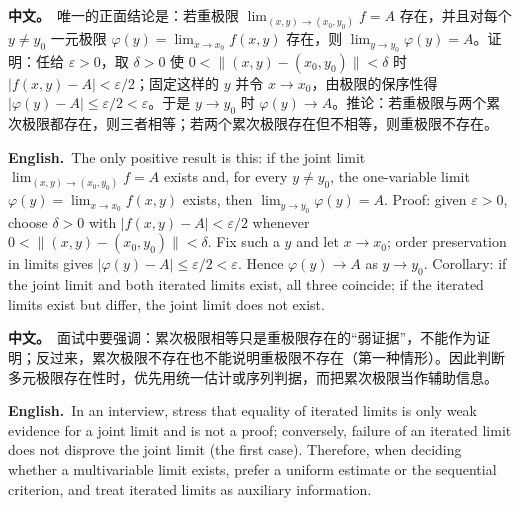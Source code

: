 \documentclass[UTF8,11pt,a4paper]{ctexart}
\newcommand{\BOTH}[2]{\par\noindent\textbf{中文。}\ #1\par\noindent\textbf{English.}\ #2\par}
\begin{document}
\BOTH{唯一的正面结论是：若重极限 $\lim_{(x,y)\to(x_0,y_0)}f=A$ 存在，并且对每个 $y\ne y_0$ 一元极限 $\varphi(y)=\lim_{x\to x_0}f(x,y)$ 存在，则 $\lim_{y\to y_0}\varphi(y)=A$。证明：任给 $\varepsilon>0$，取 $\delta>0$ 使 $0<\|(x,y)-(x_0,y_0)\|<\delta$ 时 $|f(x,y)-A|<\varepsilon/2$；固定这样的 $y$ 并令 $x\to x_0$，由极限的保序性得 $|\varphi(y)-A|\le\varepsilon/2<\varepsilon$。于是 $y\to y_0$ 时 $\varphi(y)\to A$。推论：若重极限与两个累次极限都存在，则三者相等；若两个累次极限存在但不相等，则重极限不存在。}{The only positive result is this: if the joint limit $\lim_{(x,y)\to(x_0,y_0)}f=A$ exists and, for every $y\ne y_0$, the one-variable limit $\varphi(y)=\lim_{x\to x_0}f(x,y)$ exists, then $\lim_{y\to y_0}\varphi(y)=A$. Proof: given $\varepsilon>0$, choose $\delta>0$ with $|f(x,y)-A|<\varepsilon/2$ whenever $0<\|(x,y)-(x_0,y_0)\|<\delta$. Fix such a $y$ and let $x\to x_0$; order preservation in limits gives $|\varphi(y)-A|\le\varepsilon/2<\varepsilon$. Hence $\varphi(y)\to A$ as $y\to y_0$. Corollary: if the joint limit and both iterated limits exist, all three coincide; if the iterated limits exist but differ, the joint limit does not exist.}
\BOTH{面试中要强调：累次极限相等只是重极限存在的“弱证据”，不能作为证明；反过来，累次极限不存在也不能说明重极限不存在（第一种情形）。因此判断多元极限存在性时，优先用统一估计或序列判据，而把累次极限当作辅助信息。}{In an interview, stress that equality of iterated limits is only weak evidence for a joint limit and is not a proof; conversely, failure of an iterated limit does not disprove the joint limit (the first case). Therefore, when deciding whether a multivariable limit exists, prefer a uniform estimate or the sequential criterion, and treat iterated limits as auxiliary information.}
\end{document}
